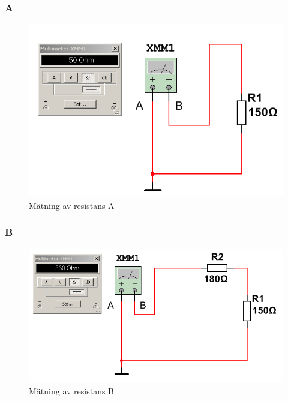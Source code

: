 \documentclass[11pt,a4paper]{article}
\begin{document}
\subsubsection{A}
\begin{figure}[htbp]
    \centering
    \includegraphics[scale=0.5]{ee466multisim/4a.png}
    \caption{Mätning av resistans A}
    \label{fig:sim-4a}
\end{figure}

\subsubsection{B}
\begin{figure}[htbp]
    \centering
    \includegraphics[scale=0.5]{ee466multisim/4b.png}
    \caption{Mätning av resistans B}
    \label{fig:sim-4b}
\end{figure}
\end{document}
